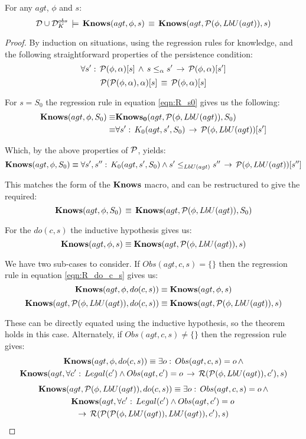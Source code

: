 \begin{lemmaext}
[\ref{lem:Knows_impl_KnowsLbU}] For any $agt$, $\phi$ and
$s$:\[
\mathcal{D}\cup\mathcal{D}_{K}^{obs}\,\models\,\mathbf{Knows}(agt,\phi,s)\,\equiv\,\mathbf{Knows}(agt,\mathcal{P}(\phi,LbU(agt)),s)\]

\end{lemmaext}
\begin{proof}
By induction on situations, using the regression rules for knowledge,
and the following straightforward properties of the persistence condition:\[
\forall s':\,\mathcal{P}(\phi,\alpha)[s]\,\wedge\, s\leq_{\alpha}s'\,\rightarrow\,\mathcal{P}(\phi,\alpha)[s']\]
 \[
\mathcal{P}(\mathcal{P}(\phi,\alpha),\alpha)[s]\,\equiv\,\mathcal{P}(\phi,\alpha)[s]\]


For $s=S_{0}$ the regression rule in equation \eqref{eqn:R_s0} gives
us the following:\begin{align*}
\mathbf{Knows}(agt,\phi,S_{0})\equiv & \mathbf{Knows_{0}}(agt,\mathcal{P}(\phi,LbU(agt)),S_{0})\\
\equiv & \forall s':\, K_{0}(agt,s',S_{0})\,\rightarrow\,\mathcal{P}(\phi,LbU(agt))[s']\end{align*}


Which, by the above properties of $\mathcal{P}$, yields:\[
\mathbf{Knows}(agt,\phi,S_{0})\equiv\forall s',s'':\, K_{0}(agt,s',S_{0})\wedge s'\leq_{LbU(agt)}s''\,\rightarrow\,\mathcal{P}(\phi,LbU(agt))[s'']\]


This matches the form of the $\mathbf{Knows}$ macro, and can be restructured
to give the required:\[
\mathbf{Knows}(agt,\phi,S_{0})\,\equiv\,\mathbf{Knows}(agt,\mathcal{P}(\phi,LbU(agt)),S_{0})\]


For the $do(c,s)$ the inductive hypothesis gives us:\[
\mathbf{Knows}(agt,\phi,s)\equiv\mathbf{Knows}(agt,\mathcal{P}(\phi,LbU(agt)),s)\]


We have two sub-cases to consider. If $Obs(agt,c,s)=\{\}$ then the
regression rule in equation \eqref{eqn:R_do_c_s} gives us:\[
\mathbf{Knows}(agt,\phi,do(c,s))\equiv\mathbf{Knows}(agt,\phi,s)\]
 \[
\mathbf{Knows}(agt,\mathcal{P}(\phi,LbU(agt)),do(c,s))\equiv\mathbf{Knows}(agt,\mathcal{P}(\phi,LbU(agt)),s)\]


These can be directly equated using the inductive hypothesis, so the
theorem holds in this case. Alternately, if $Obs(agt,c,s)\neq\{\}$
then the regression rule gives:\begin{multline*}
\mathbf{Knows}(agt,\phi,do(c,s))\equiv\exists o:\, Obs(agt,c,s)=o\,\wedge\\
\mathbf{Knows}(agt,\forall c':\, Legal(c')\wedge Obs(agt,c')=o\,\rightarrow\,\mathcal{R}(\mathcal{P}(\phi,LbU(agt)),c'),s)\end{multline*}
 \begin{multline*}
\mathbf{Knows}(agt,\mathcal{P}(\phi,LbU(agt)),do(c,s))\equiv\exists o:\, Obs(agt,c,s)=o\,\wedge\\
\mathbf{Knows}(agt,\forall c':\, Legal(c')\wedge Obs(agt,c')=o\,\\
\rightarrow\,\mathcal{R}(\mathcal{P}(\mathcal{P}(\phi,LbU(agt)),LbU(agt)),c'),s)\end{multline*}



\end{proof}
